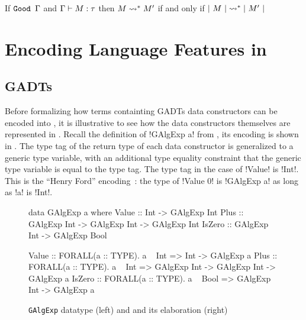 \documentclass[screen,nonacm,manuscript,review]{acmart} %
\begin{document}
\begin{corollary}\label{cor:sfc-erasure-soundness}
  If $\texttt{Good~}\Gamma$ and $\Gamma \vdash M : \tau$
  then $M \rightsquigarrow^* M'$ if and only if $|~{M}~| \rightsquigarrow^* |~{M'}~|$
\end{corollary}


\section{Encoding Language Features in \SFC}\label{sec:sfc-encoding-features}%
\subsection{GADTs}\label{sec:fc-encodes-gadts}
Before formalizing how terms containting GADTs data constructors can be encoded into \SFC,
it is illustrative to see how the data constructors themselves are represented in \SFC.
Recall the definition of !GAlgExp a! from , its \SFC encoding is
shown in . The type tag of the return type of each data constructor
is generalized to a generic type variable,
with an additional type equality constraint that the generic type variable is equal
to the type tag. The type tag in the case of !Value! is !Int!. This is the
``Henry Ford'' encoding~\cite{chapman_gentle_2010}:
the type of !Value 0! is !GAlgExp a! as long as !a! is !Int!.

\begin{figure}[ht]
\centering
\begin{minipage}[ht]{0.6\linewidth}
\begin{CenteredBox}
\begin{code}
data GAlgExp a where
  Value  :: Int         -> GAlgExp Int
  Plus   :: GAlgExp Int
         -> GAlgExp Int -> GAlgExp Int
  IsZero :: GAlgExp Int
                        -> GAlgExp Bool
\end{code}
\end{CenteredBox}
\end{minipage}%
\begin{minipage}[ht]{0.4\linewidth}
\begin{CenteredBox}
\begin{code}

Value :: FORALL(a :: TYPE). a ~ Int => Int -> GAlgExp a
Plus  :: FORALL(a :: TYPE). a ~ Int => GAlgExp Int
      -> GAlgExp Int -> GAlgExp a
IsZero :: FORALL(a :: TYPE). a ~ Bool => GAlgExp Int
       -> GAlgExp a
\end{code}
\end{CenteredBox}
\end{minipage}%
\caption{\texttt{GAlgExp} datatype (left) and and its \SFC elaboration (right)}
\label{fig:galgexp-sfc-encode}
\end{figure}
\end{document}
